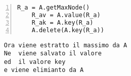 \begin{minipage}{0.49\linewidth}
	\begin{Verbatim}[frame=topline,numbers=left,label=Codice,framesep=3mm]
	R_a = A.getMaxNode()
	R_av = A.value(R_a)
	R_ak = A.key(R_a)
	A.delete(A.key(R_a))
	\end{Verbatim}
\end{minipage}\hfill
\begin{minipage}{0.49\linewidth}
	\begin{Verbatim}
	Ora viene estratto il massimo da A
	Ne  viene salvato il valore
	ed  il valore key
	e viene elimianto da A
	\end{Verbatim}
\end{minipage}
 \newline\newline